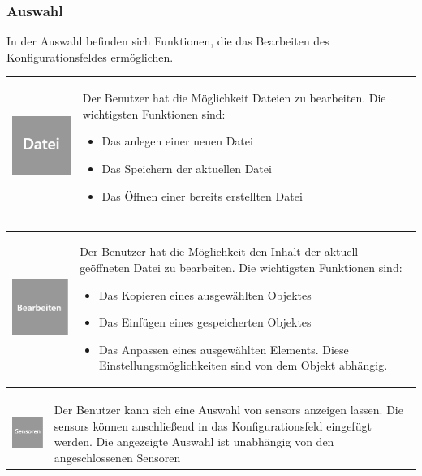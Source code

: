 \documentclass[parskip=full]{scrartcl}
\begin{document}
\subsubsection{Auswahl}

In der Auswahl befinden sich Funktionen, die das Bearbeiten des Konfigurationsfeldes ermöglichen.

\begin{tabular}[t]{p{1cm} p{10cm}} %
	\vspace{0cm}\includegraphics[width = 1 cm]{Grafik/Datei.png} & Der Benutzer hat die Möglichkeit Dateien zu bearbeiten. Die wichtigsten Funktionen sind:
	\begin{itemize} 
		\item Das anlegen einer neuen Datei
		\item Das Speichern der aktuellen Datei
		\item Das Öffnen einer bereits erstellten Datei
	\end{itemize}\\
\end{tabular}

\begin{tabular}[t]{p{1cm} p{10cm}} %
	\vspace{0cm}\includegraphics[width = 1 cm]{Grafik/Bearbeiten.png} & Der Benutzer hat die Möglichkeit den Inhalt der aktuell geöffneten Datei zu bearbeiten. Die wichtigsten Funktionen sind:
	\begin{itemize} 
		\item Das Kopieren eines ausgewählten Objektes
		\item Das Einfügen eines gespeicherten Objektes
		\item Das Anpassen eines ausgewählten Elements. Diese Einstellungsmöglichkeiten sind von dem Objekt abhängig.
	\end{itemize}
\end{tabular}

\begin{tabular}[t]{p{1cm} p{10cm}} %
	\vspace{0cm}\includegraphics[width = 1 cm]{Grafik/Sensor.png} & Der Benutzer kann sich eine Auswahl von \glspl{sensor} anzeigen lassen. Die \glspl{sensor} können anschließend in das Konfigurationsfeld eingefügt werden. Die angezeigte Auswahl ist unabhängig von den angeschlossenen Sensoren\newline
\end{tabular}
\end{document}
